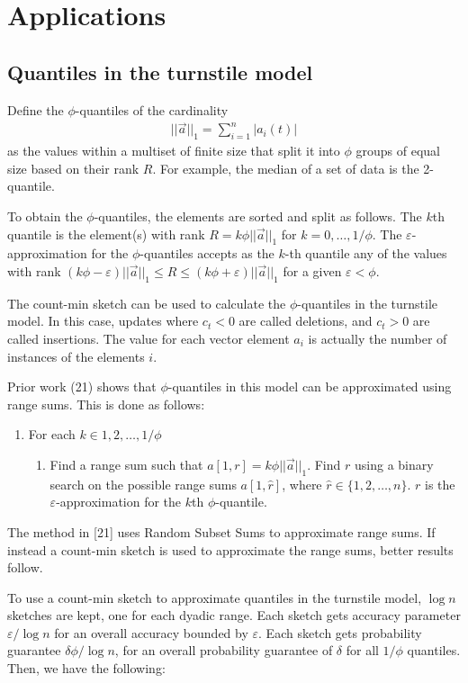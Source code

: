 \documentclass[11pt]{article}
\begin{document}
{\section{Applications}\label{sec:applications}
\subsection{Quantiles in the turnstile model}
Define the $\phi$-quantiles of the cardinality
\begin{align}
    ||\vec{a}||_1 = \sum_{i = 1}^{n}|a_i(t)|
\end{align}
as the values within a multiset of finite size that split it into $\phi$ groups
of equal size based on their rank $R$.  For example, the median of a set of data
is the 2-quantile. 

To obtain the $\phi$-quantiles, the elements are sorted and split as follows.
The $k$th quantile is the element(s) with rank $R = k\phi||\vec{a}||_1$ for $k =
0, \dots, 1/\phi$.  The $\varepsilon$-approximation for the $\phi$-quantiles
accepts as the $k$-th quantile any of the  values with rank $(k\phi -
\varepsilon)||\vec{a}||_1 \leq R \leq (k\phi + \varepsilon)||\vec{a}||_1$ for a
given $\varepsilon < \phi$.


The count-min sketch can be used to calculate the $\phi$-quantiles in the turnstile model.
In this case, updates where $c_t < 0$ are called deletions, and $c_t > 0$ are called insertions.
The value for each vector element $a_i$ is actually the number of instances of the elements
$i$.

Prior work (21) shows that $\phi$-quantiles in this model can be approximated using range sums. This is done
as follows:
\begin{enumerate}
    \item For each $k \in {1, 2, \dots, 1/\phi}$
    \begin{enumerate}
        \item Find a range sum such that $a[1, r] = k\phi||\vec{a}||_1$. Find $r$ using a binary
        search on the possible range sums $a[1, \hat{r}]$, where $\hat{r} \in \{1, 2, \dots, n\}$.  $r$ is the
        $\varepsilon$-approximation for the $k$th $\phi$-quantile.
    \end{enumerate}
\end{enumerate}
The method in [21] uses Random Subset Sums to approximate range sums.  If instead a count-min
sketch is used to approximate the range sums, better results follow.  

To use a count-min sketch to approximate quantiles in the turnstile model, $\log n$ sketches are kept,
one for each dyadic range. Each sketch gets accuracy parameter $\varepsilon/\log n$ for an overall accuracy
bounded by $\varepsilon$. Each sketch gets probability guarantee $\delta\phi/\log n$, for
an overall probability guarantee of $\delta$ for all $1/\phi$ quantiles. Then, we have the following:

}
\end{document}
